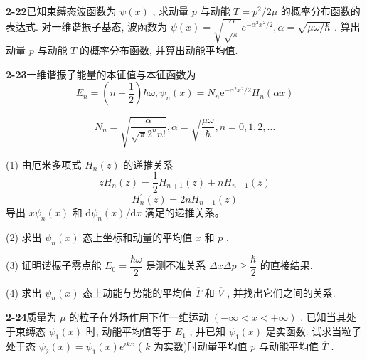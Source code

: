 \textbf{2-22}\quad 已知束缚态波函数为 $\displaystyle \psi(x)$ , 求动量 $\displaystyle p$ 与动能 $\displaystyle T = p^2 / 2\mu$ 的概率分布函数的表达式. 对一维谐振子基态, 波函数为 $\displaystyle \psi(x) = \sqrt{\dfrac{\alpha}{\sqrt{\pi}}} e^{-\alpha^2 x^2 / 2}, \alpha = \sqrt{\mu \omega / \hbar}$ . 算出动量 $\displaystyle p$ 与动能 $\displaystyle T$ 的概率分布函数, 并算出动能平均值.

\vfill

\newpage

\textbf{2-23}\quad 一维谐振子能量的本征值与本征函数为
\begin{equation}\tag{1}
E _ {n} = \left(n + \dfrac {1}{2}\right) \hbar \omega , \psi_ {n} (x) = N _ {n} \mathrm{e} ^ {- \alpha^ {2} x ^ {2} / 2} H _ {n} (\alpha x)
\end{equation}

\begin{equation}\tag{2}
N _ {n} = \sqrt {\dfrac {\alpha}{\sqrt {\pi} 2 ^ {n} n !}}, \alpha = \sqrt {\dfrac {\mu \omega}{\hbar}}, n = 0, 1, 2, \dots
\end{equation}

(1) 由厄米多项式 $\displaystyle H_{n}(z)$ 的递推关系
\begin{equation}\tag{3}
z H _ {n} (z) = \dfrac {1}{2} H _ {n + 1} (z) + n H _ {n - 1} (z)
\end{equation}
\begin{equation}\tag{4}
H _ {n} ^ {\prime} (z) = 2 n H _ {n - 1} (z)
\end{equation}
导出 $\displaystyle x \psi_{n}(x)$ 和 $\displaystyle \mathrm{d} \psi_{n}(x) / \mathrm{d} x$ 满足的递推关系。

(2) 求出 $\displaystyle \psi_{n}(x)$ 态上坐标和动量的平均值 $\displaystyle \overline{x}$ 和 $\displaystyle \overline{p}$ .

(3) 证明谐振子零点能 $\displaystyle E_{0} = \dfrac{\hbar \omega}{2}$ 是测不准关系 $\displaystyle \Delta x \Delta p \geqslant \dfrac{\hbar}{2}$ 的直接结果.

(4) 求出 $\displaystyle \psi_{n}(x)$ 态上动能与势能的平均值 $\displaystyle \overline{T}$ 和 $\displaystyle \overline{V}$ , 并找出它们之间的关系.

\vfill

\newpage

\textbf{2-24}\quad 质量为 $\displaystyle \mu$ 的粒子在外场作用下作一维运动 $\displaystyle (- \infty < x < + \infty)$ . 已知当其处于束缚态 $\displaystyle \psi_{1}(x)$ 时, 动能平均值等于 $\displaystyle E_{1}$ , 并已知 $\displaystyle \psi_{1}(x)$ 是实函数. 试求当粒子处于态 $\displaystyle \psi_{2}(x) = \psi_{1}(x)e^{ikx}$ ( $\displaystyle k$ 为实数)时动量平均值 $\displaystyle \overline{p}$ 与动能平均值 $\displaystyle \overline{T}$ .

